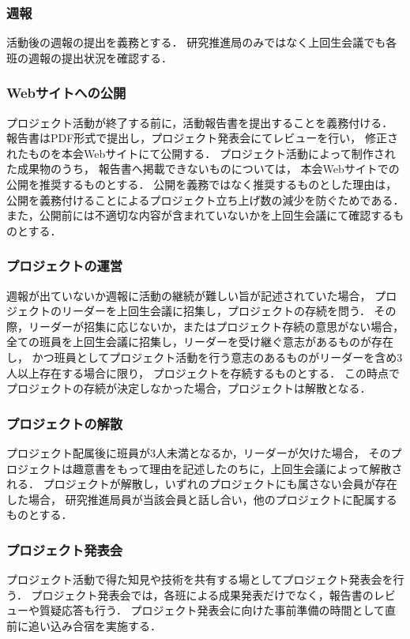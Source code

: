 \subsubsection*{週報}
活動後の週報の提出を義務とする．
研究推進局のみではなく上回生会議でも各班の週報の提出状況を確認する．

\subsubsection*{Webサイトへの公開}
プロジェクト活動が終了する前に，活動報告書を提出することを義務付ける．
報告書はPDF形式で提出し，プロジェクト発表会にてレビューを行い，
修正されたものを本会Webサイトにて公開する．
プロジェクト活動によって制作された成果物のうち，
報告書へ掲載できないものについては，
本会Webサイトでの公開を推奨するものとする．
公開を義務ではなく推奨するものとした理由は，
公開を義務付けることによるプロジェクト立ち上げ数の減少を防ぐためである．
また，公開前には不適切な内容が含まれていないかを上回生会議にて確認するものとする．

\subsubsection*{プロジェクトの運営}
週報が出ていないか週報に活動の継続が難しい旨が記述されていた場合，
プロジェクトのリーダーを上回生会議に招集し，プロジェクトの存続を問う．
その際，リーダーが招集に応じないか，またはプロジェクト存続の意思がない場合，
全ての班員を上回生会議に招集し，リーダーを受け継ぐ意志があるものが存在し，
かつ班員としてプロジェクト活動を行う意志のあるものがリーダーを含め3人以上存在する場合に限り，
プロジェクトを存続するものとする．
この時点でプロジェクトの存続が決定しなかった場合，プロジェクトは解散となる．

\subsubsection*{プロジェクトの解散}
プロジェクト配属後に班員が3人未満となるか，リーダーが欠けた場合，
そのプロジェクトは趣意書をもって理由を記述したのちに，上回生会議によって解散される．
プロジェクトが解散し，いずれのプロジェクトにも属さない会員が存在した場合，
研究推進局員が当該会員と話し合い，他のプロジェクトに配属するものとする．

\subsubsection*{プロジェクト発表会}
プロジェクト活動で得た知見や技術を共有する場としてプロジェクト発表会を行う．
プロジェクト発表会では，各班による成果発表だけでなく，報告書のレビューや質疑応答も行う．
プロジェクト発表会に向けた事前準備の時間として直前に追い込み合宿を実施する．